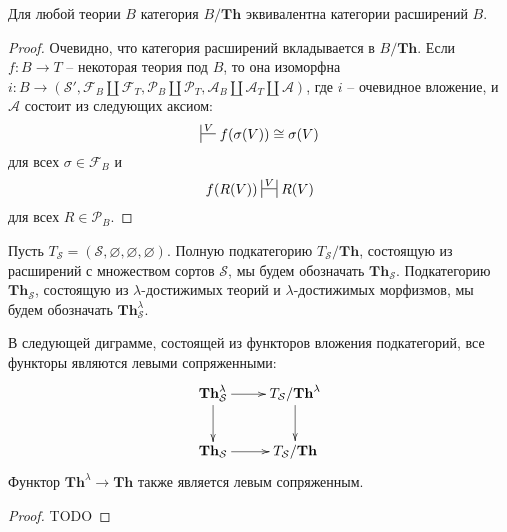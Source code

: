 \documentclass[reqno]{amsart}
\theoremstyle{definition}
\theoremstyle{remark}
\newcommand{\bcat}[1]{\mathbf{#1}}
\newcommand{\Th}{\bcat{Th}}
\begin{document}
\begin{lem}[th-ext]
Для любой теории $B$ категория $B/\Th$ эквивалентна категории расширений $B$.
\end{lem}
\begin{proof}
Очевидно, что категория расширений вкладывается в $B/\Th$.
Если $f : B \to T$ -- некоторая теория под $B$, то она изоморфна $i : B \to (\mathcal{S}', \mathcal{F}_B \amalg \mathcal{F}_T, \mathcal{P}_B \amalg \mathcal{P}_T, \mathcal{A}_B \amalg \mathcal{A}_T \amalg \mathcal{A})$,
где $i$ -- очевидное вложение, и $\mathcal{A}$ состоит из следующих аксиом:
\[ \sststile{}{V} f(\sigma(V)) \cong \sigma(V) \]
для всех $\sigma \in \mathcal{F}_B$ и
\[ f(R(V)) \ssststile{}{V} R(V) \]
для всех $R \in \mathcal{P}_B$.
\end{proof}

Пусть $T_\mathcal{S} = (\mathcal{S},\varnothing,\varnothing,\varnothing)$.
Полную подкатегорию $T_\mathcal{S}/\Th$, состоящую из расширений с множеством сортов $\mathcal{S}$, мы будем обозначать $\Th_\mathcal{S}$.
Подкатегорию $\Th_\mathcal{S}$, состоящую из $\lambda$-достижимых теорий и $\lambda$-достижимых морфизмов, мы будем обозначать $\Th_\mathcal{S}^\lambda$.

\begin{prop}[th-adj]
В следующей диграмме, состоящей из функторов вложения подкатегорий, все функторы являются левыми сопряженными:
\[ \xymatrix{ \Th_\mathcal{S}^\lambda \ar[r] \ar[d] & T_\mathcal{S}/\Th^\lambda \ar[d] \\
              \Th_\mathcal{S}         \ar[r]        & T_\mathcal{S}/\Th
            } \]
Функтор $\Th^\lambda \to \Th$ также является левым сопряженным.
\end{prop}
\begin{proof}
TODO
\end{proof}
\end{document}
